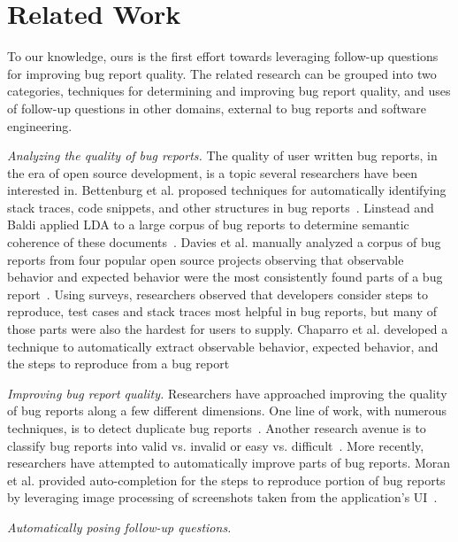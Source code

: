 \section{Related Work}
To our knowledge, ours is the first effort towards leveraging follow-up questions for
improving bug report quality. The related research can be grouped into two categories, techniques
for determining and improving bug report quality, and uses of follow-up questions in other domains,
external to bug reports and software engineering.

\noindent
{\em Analyzing the quality of bug reports.} The quality of user written bug reports,
in the era of open source development, is a topic several researchers have been interested
in. Bettenburg et al. proposed techniques for automatically identifying stack traces, code
snippets, and other structures in bug reports~\cite{bettenburg08extracting}. Linstead and Baldi
applied LDA to a large corpus of bug reports to determine semantic coherence of these
documents~\cite{linstead09mining}. Davies et al. manually analyzed a corpus of bug reports
from four popular open source projects observing
that observable behavior and expected behavior were the most consistently found parts
of a bug report~\cite{davies14whats}. Using surveys, researchers observed that developers
consider steps to reproduce, test cases and stack traces most helpful in bug reports, but
many of those parts were also the hardest for users to supply. Chaparro et al. developed a
technique to automatically extract observable behavior, expected behavior, and the steps to
reproduce from a bug report~\cite{chaparro17detecting}

\noindent
{\em Improving bug report quality.} Researchers have approached improving the quality of
bug reports along a few different dimensions. One line of work, with numerous techniques,
is to detect duplicate bug reports~\cite{chaparro19reformulating}. Another research avenue
is to classify bug reports into valid vs. invalid or easy vs. difficult~\cite{fan20chaff,hooimeijer07modeling}.
More recently, researchers have attempted to automatically improve parts of bug reports. Moran et al. provided
auto-completion for the steps to reproduce portion of bug reports by leveraging image processing
of screenshots taken from the application's UI~\cite{moran15autocompleting}.

\noindent
{\em Automatically posing follow-up questions.}
